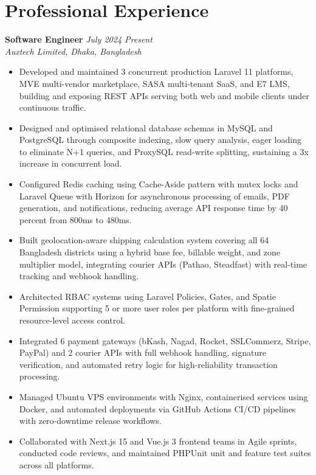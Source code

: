 \documentclass[a4paper,10.5pt]{article}
\begin{document}
\vspace{2pt}

\section{Professional Experience}
\vspace{2pt}

\textbf{Software Engineer} \hfill \textit{July 2024 \textemdash{} Present}\\
\textit{Auxtech Limited, Dhaka, Bangladesh}

\vspace{3pt}
\begin{itemize}[noitemsep, topsep=0pt, leftmargin=1.3em, label={$\bullet$}]
  \item Developed and maintained 3 concurrent production Laravel 11 platforms, MVE multi-vendor marketplace, SASA multi-tenant SaaS, and E7 LMS, building and exposing REST APIs serving both web and mobile clients under continuous traffic.
  \item Designed and optimised relational database schemas in MySQL and PostgreSQL through composite indexing, slow query analysis, eager loading to eliminate N+1 queries, and ProxySQL read-write splitting, sustaining a 3x increase in concurrent load.
  \item Configured Redis caching using Cache-Aside pattern with mutex locks and Laravel Queue with Horizon for asynchronous processing of emails, PDF generation, and notifications, reducing average API response time by 40 percent from 800ms to 480ms.
  \item Built geolocation-aware shipping calculation system covering all 64 Bangladesh districts using a hybrid base fee, billable weight, and zone multiplier model, integrating courier APIs (Pathao, Steadfast) with real-time tracking and webhook handling.
  \item Architected RBAC systems using Laravel Policies, Gates, and Spatie Permission supporting 5 or more user roles per platform with fine-grained resource-level access control.
  \item Integrated 6 payment gateways (bKash, Nagad, Rocket, SSLCommerz, Stripe, PayPal) and 2 courier APIs with full webhook handling, signature verification, and automated retry logic for high-reliability transaction processing.
  \item Managed Ubuntu VPS environments with Nginx, containerised services using Docker, and automated deployments via GitHub Actions CI/CD pipelines with zero-downtime release workflows.
  \item Collaborated with Next.js 15 and Vue.js 3 frontend teams in Agile sprints, conducted code reviews, and maintained PHPUnit unit and feature test suites across all platforms.
\end{itemize}
\end{document}
